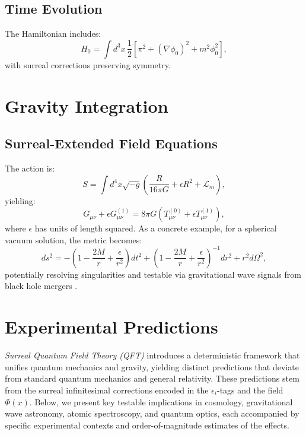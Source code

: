 \documentclass{article}
\begin{document}
\subsection{Time Evolution}
The Hamiltonian includes:
\begin{equation}
H_0 = \int d^3x \, \frac{1}{2} [\pi^2 + (\nabla \phi_0)^2 + m^2 \phi_0^2],
\end{equation}
with surreal corrections preserving symmetry.

\section{Gravity Integration}
\subsection{Surreal-Extended Field Equations}
The action is:
\begin{equation}
S = \int d^4x \sqrt{-g} \left( \frac{R}{16\pi G} + \epsilon R^2 + \mathcal{L}_m \right),
\end{equation}
yielding:
\begin{equation}
G_{\mu\nu} + \epsilon G_{\mu\nu}^{(1)} = 8\pi G \left( T_{\mu\nu}^{(0)} + \epsilon T_{\mu\nu}^{(1)} \right),
\end{equation}
where \(\epsilon\) has units of length squared. As a concrete example, for a spherical vacuum solution, the metric becomes:
\begin{equation}
ds^2 = -\left(1 - \frac{2M}{r} + \frac{\epsilon}{r^2}\right) dt^2 + \left(1 - \frac{2M}{r} + \frac{\epsilon}{r^2}\right)^{-1} dr^2 + r^2 d\Omega^2,
\end{equation}
potentially resolving singularities and testable via gravitational wave signals from black hole mergers \cite{LIGO2016}.

\section{Experimental Predictions}
\textit{Surreal Quantum Field Theory (QFT)} introduces a deterministic framework that unifies quantum mechanics and gravity, yielding distinct predictions that deviate from standard quantum mechanics and general relativity. These predictions stem from the surreal infinitesimal corrections encoded in the \(\epsilon_i\)-tags and the field \(\Phi(x)\). Below, we present key testable implications in cosmology, gravitational wave astronomy, atomic spectroscopy, and quantum optics, each accompanied by specific experimental contexts and order-of-magnitude estimates of the effects.
\end{document}
